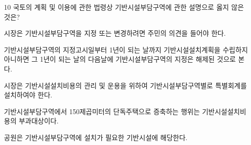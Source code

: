 \begin{question}{10}
국토의 계획 및 이용에 관한 법령상 기반시설부담구역에 관한 설명으로 옳지 않은 것은?
\begin{choices}
  \item 시장은 기반시설부담구역을 지정 또는 변경하려면 주민의 의견을 들어야 한다.
  \item 기반시설부담구역의 지정고시일부터 1년이 되는 날까지 기반시설설치계획을 수립하지 아니하면 그 1년이 되는 날의 다음날에 기반시설부담구역의 지정은 해제된 것으로 본다.
  \item 시장은 기반시설설치비용의 관리 및 운용을 위하여 기반시설부담구역별로 특별회계를 설치하여야 한다.
  \item 기반시설부담구역에서 150제곱미터의 단독주택으로 증축하는 행위는 기반시설설치비용의 부과대상이다.
  \item 공원은 기반시설부담구역에 설치가 필요한 기반시설에 해당한다.
\end{choices}
\end{question}

